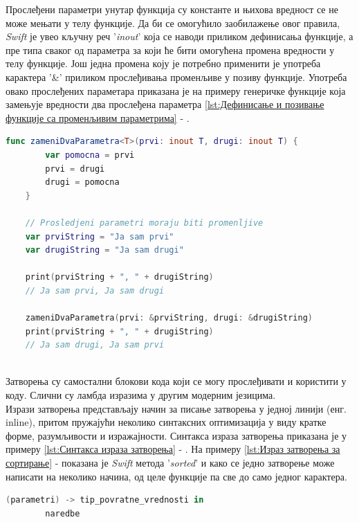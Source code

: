 \documentclass[12pt,oneside]{memoir}
\begin{document}
\indent Прослеђени параметри унутар функција су константе и њихова вредност се не може мењати у телу функције. Да би се омогућило заобилажење овог правила, \textit{Swift} је увео кључну реч '\textit{inout}' која се наводи приликом дефинисања функције, а пре типа сваког од параметра за који ће бити омогућена промена вредности у телу функције. Још једна промена коју је потребно применити је употреба карактера '\&' приликом прослеђивања променљиве у позиву функције. Употреба овако прослеђених параметара приказана је на примеру генеричке функције која замењује вредности два прослеђена параметра \ref{lst:Дефинисање и позивање функције са променљивим параметрима} - . 

\begin{lstlisting}[caption=\textit{{Дефинисање и позивање функције са променљивим параметрима}}, label={lst:Дефинисање и позивање функције са променљивим параметрима}, language=Swift, frame=single]
    func zameniDvaParametra<T>(prvi: inout T, drugi: inout T) {
        var pomocna = prvi
        prvi = drugi
        drugi = pomocna
    }
    
    // Prosledjeni parametri moraju biti promenljive
    var prviString = "Ja sam prvi"
    var drugiString = "Ja sam drugi"
    
    print(prviString + ", " + drugiString)
    // Ja sam prvi, Ja sam drugi
    
    zameniDvaParametra(prvi: &prviString, drugi: &drugiString)
    print(prviString + ", " + drugiString)
    // Ja sam drugi, Ja sam prvi
    
\end{lstlisting}

\indent Затворења су самостални блокови кода који се могу прослеђивати и користити у коду. Слични су ламбда изразима у другим модерним језицима. \\
\indent Изрази затворења представљају начин за писање затворења у једној линији (енг. inline), притом пружајући неколико синтаксних оптимизација у виду кратке форме, разумљивости и изражајности. Синтакса израза затворења приказана је у примеру \ref{lst:Синтакса израза затворења} - . На примеру \ref{lst:Израз затворења за сортирање} -  показана је \textit{Swift} метода '\textit{sorted}' и како се једно затворење може написати на неколико начина, од целе функције па све до само једног карактера.

\begin{lstlisting}[caption=\textit{{Синтакса израза затворења}}, label={lst:Синтакса израза затворења}, language=Swift, frame=single]
    (parametri) -> tip_povratne_vrednosti in
        naredbe
\end{lstlisting}
\end{document}
